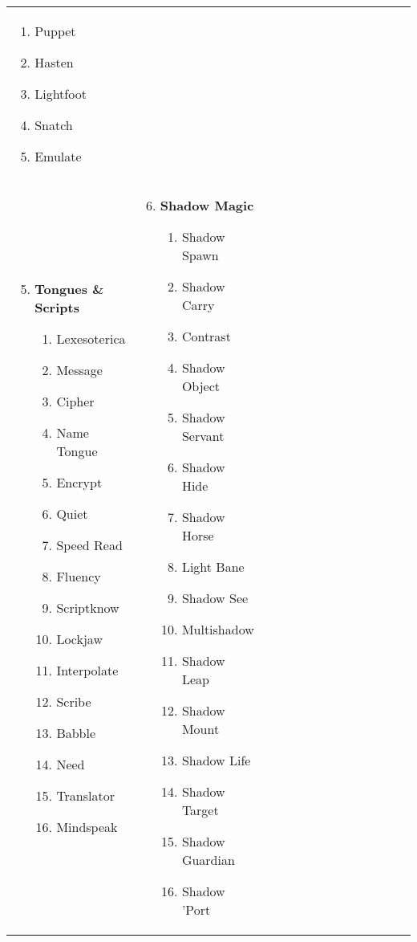 \begin{tabular}{@{} p{0.25\linewidth} p{0.25\linewidth} p{0.25\linewidth} p{0.25\linewidth}}
\begin{enumerate}
\begin{enumerate}
		\item Puppet
		\item Hasten
		\item Lightfoot
		\item Snatch
		\item Emulate
	\end{enumerate}
\end{enumerate} \\
\begin{enumerate}
	\setcounter{enumi}{4}
	\item \textbf{Tongues \& Scripts}
	\begin{enumerate}
		\item Lexesoterica
		\item Message
		\item Cipher
		\item Name Tongue
		\item Encrypt
		\item Quiet
		\item Speed Read
		\item Fluency
		\item Scriptknow
		\item Lockjaw
		\item Interpolate
		\item Scribe
		\item Babble
		\item Need
		\item Translator
		\item Mindspeak
	\end{enumerate}
\end{enumerate} &
\begin{enumerate}
	\setcounter{enumi}{5}
	\item \textbf{Shadow Magic}
	\begin{enumerate}
		\item Shadow Spawn
		\item Shadow Carry
		\item Contrast
		\item Shadow Object
		\item Shadow Servant
		\item Shadow Hide
		\item Shadow Horse
		\item Light Bane
		\item Shadow See
		\item Multishadow
		\item Shadow Leap
		\item Shadow Mount
		\item Shadow Life
		\item Shadow Target
		\item Shadow Guardian
		\item Shadow 'Port
	\end{enumerate}
\end{enumerate}
\end{tabular}
\pagebreak

